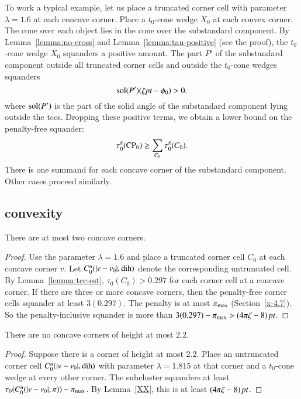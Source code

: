 To work a typical example, let us place a truncated corner cell with
parameter $\lambda=1.6$ at each concave corner.  Place a $t_0$-cone
wedge $X_0$ at each convex corner. The cone over each object lies in the
cone over the substandard component. By Lemma~\ref{lemma:no-cross} and
Lemma~\ref{lemma:tau-positive} (see the proof), the $t_0$-cone wedge
$X_0$ squanders a positive amount.  The part $P'$ of the substandard component
outside all truncated corner cells and outside the $t_0$-cone wedges
squanders
    $$\operatorname{sol}(P')(\zeta\hbox{\it pt}-\phi_0) > 0.$$
where $\operatorname{sol}(P')$ is the part of the solid angle of the substandard component
lying outside the tccs. Dropping these positive terms, we obtain a
lower bound on the penalty-free squander:
    $$\tau^g_0({\operatorname{CP}}_0) \ge \sum_{C_0} \tau^g_0(C_0).$$
There is one summand for each concave corner of the substandard component.
Other cases proceed similarly.


\subsection{convexity} %

\begin{lemma}
There are at most two concave corners.
\end{lemma}

\begin{proof}
Use the parameter $\lambda=1.6$ and place a truncated corner cell $C_0$
at each concave corner $v$. Let $C_0^u(|v-v_0|,\operatorname{dih})$ denote the
corresponding untruncated cell.  By Lemma~\ref{lemma:tcc-est},
$\tau_0(C_0) > 0.297$ for each corner cell at a concave corner.
If there are three or more concave corners, then the penalty-free corner
cells squander at least $3(0.297)$. The penalty is at most $\pi_{\max}$
(Section~\ref{x-4.7}). So the penalty-inclusive squander is more than
    $3(0.297) - \pi_{\max} >(4\pi\zeta-8)\,\hbox{\it pt}$.
\end{proof}

\begin{lemma}
There are no concave corners of height at most $2.2$.
\end{lemma}

\begin{proof}
Suppose there is a corner of height at most $2.2$. Place an
untruncated corner cell $C^u_0(|v-v_0|,\operatorname{dih})$ with parameter $\lambda
=1.815$ at that corner and a $t_0$-cone wedge at every other corner. 
The
subcluster squanders at least
    $\tau_0(C^u_0(|v-v_0|,\pi))-\pi_{\max}$.
By Lemma~\ref{XX}, this is at least $(4\pi\zeta-8)\,\hbox{\it pt}$.
\end{proof}


